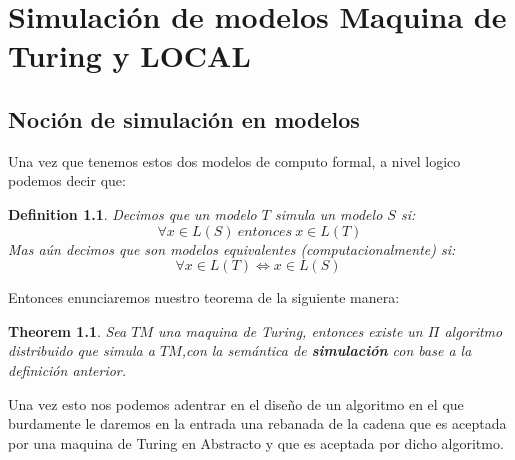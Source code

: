 \documentclass[10pt]{report}
\newtheorem{definition}{Definition}
\newtheorem{theorem}{Theorem}
\begin{document}
    \chapter{Simulación de modelos Maquina de Turing y \textbf{LOCAL}}\label{ch:simulacion-de-modelostextbfytextbf}
    \section{Noción de simulación en modelos}\label{sec:nocion-de-simulación-en-modelos}
    Una vez que tenemos estos dos modelos de computo formal, a nivel logico podemos decir que:
    \theoremstyle{definition}
    \begin{definition}
        Decimos que un modelo $T$ simula un modelo $S$ si:
        \begin{equation}
        \forall x\in L(S) \ entonces \ x\in L(T)
        \end{equation}
        Mas aún decimos que son modelos equivalentes (computacionalmente) si:
        \begin{equation}
        \forall x\in L(T) \iff x\in L(S) \
        \end{equation}
    \end{definition}
    \space
    Entonces enunciaremos nuestro teorema de la siguiente manera:

    \begin{theorem}
        Sea $TM$ una maquina de Turing, entonces existe un $\Pi$ algoritmo distribuido que simula
        a $TM$,con la semántica de \textbf{simulación} con base a la definición anterior.
    \end{theorem}
    Una vez esto nos podemos adentrar en el diseño de un algoritmo en el que burdamente le daremos en la entrada una
    rebanada de la cadena que es aceptada por una maquina de Turing en Abstracto y que es aceptada por dicho algoritmo.
\end{document}
